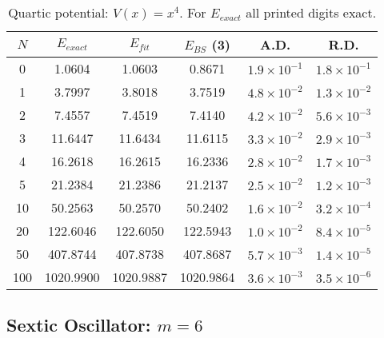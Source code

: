 \documentclass[preprint,preprintnumbers,amsmath,amssymb]{revtex4}
\begin{document}
\begin{table}[h]
	\caption{Quartic potential: $V(x)=x^4$. For $E_{exact}$ all printed digits exact.}
	{\setlength{\tabcolsep}{0.4cm}		
		\begin{tabular}{cccccc}
			\hline				
			$N$ & $E_{exact}$ & $E_{fit}$& $E_{BS}$ (3) & A.D. & R.D. \\
			\hline		
			0   & 1.0604     & 1.0603  & 0.8671     & $1.9\times 10^{-1}$     & $1.8\times10^{-1}$             \\
			1   & 3.7997     & 3.8018  & 3.7519     & $4.8\times 10^{-2}$     & $1.3\times10^{-2}$              \\
			2   & 7.4557     & 7.4519  & 7.4140     & $4.2\times10^{-2}$      & $5.6\times10^{-3}$             \\
			3   & 11.6447    & 11.6434 &  11.6115   & $3.3\times10^{-2}$      &  $2.9\times10^{-3}$            \\
			4   & 16.2618    & 16.2615 & 16.2336    & $2.8\times10^{-2}$      & $1.7\times10^{-3}$             \\
			5   & 21.2384    & 21.2386 &  21.2137   & $2.5\times10^{-2}$      & $1.2\times10^{-3}$             \\
			10  & 50.2563    & 50.2570 &  50.2402   & $1.6\times10^{-2} $     &  $3.2\times10^{-4}$            \\
			20  & 122.6046   & 122.6050 & 122.5943  & $1.0\times10^{-2}$      & $8.4\times10^{-5}$              \\
			50  & 407.8744   & 407.8738 & 407.8687  & $5.7\times10^{-3}$      & $1.4\times10^{-5}$             \\
	       100 & 1020.9900   & 1020.9887 & 1020.9864 & $3.6\times10^{-3}$     & $3.5\times10^{-6}$\\
			\hline				
		\end{tabular}
	}
\end{table}

\subsection*{Sextic Oscillator: $m=6$}
\end{document}
